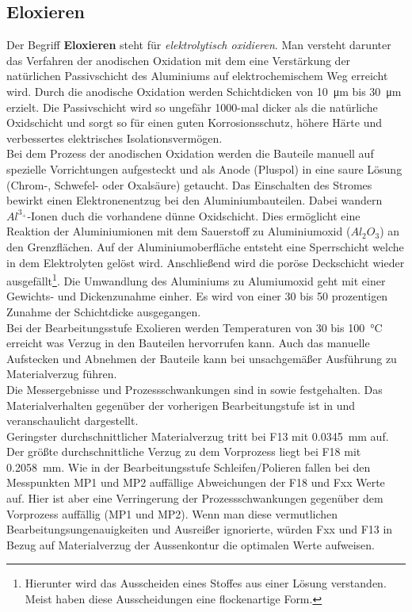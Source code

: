 \documentclass[12pt,a4paper,parskip,twoside,BCOR5mm,headsepline]{scrartcl}
\begin{document}
\begin{description*}
\newpage




  
 
\subsection{Eloxieren}
Der Begriff \textbf{Eloxieren} steht für \textsl{elektrolytisch oxidieren}. Man versteht darunter das Verfahren der anodischen Oxidation mit dem eine Verstärkung der natürlichen Passivschicht des Aluminiums auf elektrochemischem Weg erreicht wird. Durch die anodische Oxidation werden Schichtdicken von \SI{10}{\micro\meter} bis \SI{30}{\micro\meter} erzielt. Die Passivschicht wird so ungefähr 1000-mal dicker als die natürliche Oxidschicht und sorgt so für einen guten Korrosionsschutz, höhere Härte und verbessertes elektrisches  Isolationsvermögen.\\
 Bei dem Prozess der anodischen Oxidation werden die Bauteile manuell auf spezielle Vorrichtungen aufgesteckt und als Anode (Pluspol) in eine saure Lösung (Chrom-, Schwefel- oder Oxalsäure) getaucht. Das Einschalten des Stromes bewirkt einen Elektronenentzug bei den Aluminiumbauteilen. Dabei wandern $Al^{3_+}$-Ionen duch die vorhandene dünne Oxidschicht. Dies ermöglicht eine Reaktion der Aluminiumionen mit dem Sauerstoff zu Aluminiumoxid ($Al_2O_3$) an den Grenzflächen. Auf der Aluminiumoberfläche entsteht eine Sperrschicht welche in dem Elektrolyten gelöst wird. Anschließend wird die poröse Deckschicht wieder ausgefällt\footnote{Hierunter wird das Ausscheiden eines Stoffes aus einer Lösung verstanden. Meist haben diese Ausscheidungen eine flockenartige Form.}.
Die Umwandlung des Aluminiums zu Alumiumoxid geht mit einer Gewichts- und Dickenzunahme einher. Es wird von einer 30 bis 50 prozentigen Zunahme der Schichtdicke ausgegangen. \autocite[127-128]{wm}\\
Bei der Bearbeitungsstufe Exolieren werden Temperaturen von 30 bis \SI{100}{\degreeCelsius} erreicht was Verzug in den Bauteilen hervorrufen kann. Auch das manuelle Aufstecken und Abnehmen der Bauteile kann bei unsachgemäßer Ausführung zu Materialverzug führen.\\
Die Messergebnisse und Prozessschwankungen sind in  sowie  festgehalten. Das Materialverhalten gegenüber der vorherigen Bearbeitungstufe ist in  und  veranschaulicht dargestellt.\\
Geringster durchschnittlicher Materialverzug tritt bei F13 mit \SI{0,0345}{\milli\meter} auf. Der größte durchschnittliche Verzug zu dem Vorprozess liegt bei F18 mit \SI{0,2058}{\milli\meter}. Wie in der Bearbeitungsstufe Schleifen/Polieren fallen bei den Messpunkten MP1 und MP2 auffällige Abweichungen der F18 und Fxx Werte auf. Hier ist aber eine Verringerung der Prozessschwankungen gegenüber dem Vorprozess auffällig (MP1 und MP2). Wenn man diese vermutlichen Bearbeitungsungenauigkeiten und Ausreißer ignorierte, würden Fxx und F13 in Bezug auf Materialverzug der Aussenkontur die optimalen Werte aufweisen.\\

\end{description*}
\end{document}
